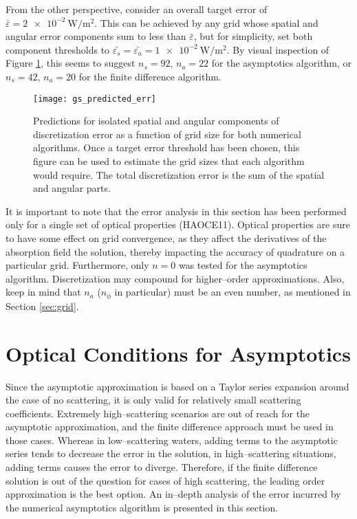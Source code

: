 From the other perspective, consider an overall target error of $\bar{\varepsilon}=\SI{2e-2}{\W\per\m\squared}$.
This can be achieved by any grid whose spatial and angular error components sum to less than $\bar{\varepsilon}$, but for simplicity, set both component thresholds to $\bar{\varepsilon_s}=\bar{\varepsilon_a}=\SI{1e-2}{\W\per\m\squared}$.
By visual inspection of Figure \ref{fig:gs_predicted_err}, this seems to suggest $n_s=92$, $n_a=22$ for the asymptotics algorithm, or $n_s=42$, $n_a=20$ for the finite difference algorithm.

\begin{figure}[H]
  \centering
  \texttt{[image: gs\_predicted\_err]}
  \caption{Predictions for isolated spatial and angular components of discretization error as a function of grid size for both numerical algorithms. Once a target error threshold has been chosen, this figure can be used to estimate the grid sizes that each algorithm would require. The total discretization error is the sum of the spatial and angular parts.}
  \label{fig:gs_predicted_err}
\end{figure}

It is important to note that the error analysis in this section has been performed only for a single set of optical properties (HAOCE11).
Optical properties are sure to have some effect on grid convergence, as they affect the derivatives of the absorption field the solution, thereby impacting the accuracy of quadrature on a particular grid.
Furthermore, only $n=0$ was tested for the asymptotics algorithm.
Discretization may compound for higher--order approximations.
Also, keep in mind that $n_a$ ($n_\phi$ in particular) must be an even number, as mentioned in Section \ref{sec:grid}.

\section{Optical Conditions for Asymptotics}
Since the asymptotic approximation is based on a Taylor series expansion around the case of no scattering, it is only valid for relatively small scattering coefficients.
Extremely high--scattering scenarios are out of reach for the asymptotic approximation, and the finite difference approach must be used in those cases.
Whereas in low--scattering waters, adding terms to the asymptotic series tends to decrease the error in the solution, in high--scattering situations, adding terms causes the error to diverge.
Therefore, if the finite difference solution is out of the question for cases of high scattering, the leading order approximation is the best option.
An in--depth analysis of the error incurred by the numerical asymptotics algorithm is presented in this section.

